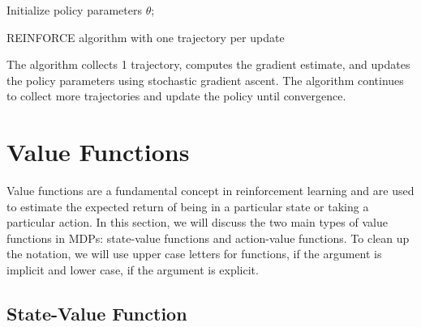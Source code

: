 \begin{algorithm}[H]
    \SetAlgoLined
        Initialize policy parameters $\theta$;
    \caption{REINFORCE algorithm with one trajectory per update}
\end{algorithm}
    
The algorithm collects 1 trajectory, computes the gradient estimate, and updates the policy parameters using stochastic gradient ascent. The algorithm continues to collect more trajectories and update the policy until convergence.


\section{Value Functions}

Value functions are a fundamental concept in reinforcement learning and are used to estimate the expected return of being in a particular state or taking a particular action. In this section, we will discuss the two main types of value functions in MDPs: state-value functions and action-value functions.
To clean up the notation, we will use upper case letters for functions, if the argument 
is implicit and lower case, if the argument is explicit.

\subsection{State-Value Function}

